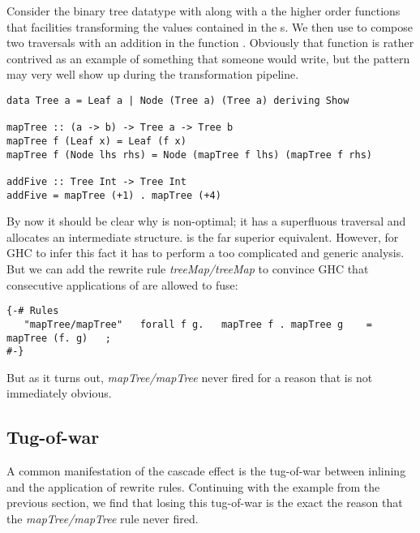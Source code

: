 Consider the binary tree datatype  with along with a the higher order  functions that
facilities transforming the values contained in the s. We then use  to compose two
traversals with an addition in the function . Obviously that function is rather contrived as
an example of something that someone would write, but the pattern may very well show up during the transformation pipeline.


\begin{listing}[H]
\begin{verbatim}
data Tree a = Leaf a | Node (Tree a) (Tree a) deriving Show

mapTree :: (a -> b) -> Tree a -> Tree b
mapTree f (Leaf x) = Leaf (f x)
mapTree f (Node lhs rhs) = Node (mapTree f lhs) (mapTree f rhs)

addFive :: Tree Int -> Tree Int
addFive = mapTree (+1) . mapTree (+4)
\end{verbatim}
\end{listing}

By now it should be clear why  is non-optimal; it has a superfluous traversal and allocates an
intermediate structure.  is the far superior equivalent. However, for GHC to infer this fact
it has to perform a too complicated and generic analysis. But we can add the rewrite rule \textit{treeMap/treeMap}
to convince GHC that consecutive applications of  are allowed to fuse:

\begin{listing}[H]
\begin{verbatim}
{-# Rules
   "mapTree/mapTree"   forall f g.   mapTree f . mapTree g    = mapTree (f. g)   ;
#-}
\end{verbatim}
\end{listing}

But as it turns out, \textit{mapTree/mapTree} never fired for a reason that is not immediately obvious.

\subsection{Tug-of-war}

A common manifestation of the cascade effect is the tug-of-war between inlining and the application
of rewrite rules. Continuing with the  example from the previous section, we find that losing this
tug-of-war is the exact the reason that the \textit{mapTree/mapTree} rule never fired.

